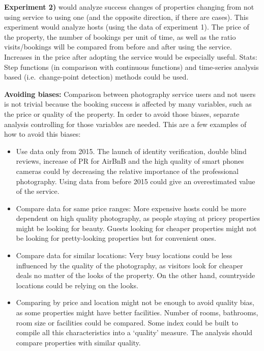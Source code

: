 \documentclass[
]{article}
\begin{document}
\textbf{Experiment 2)} would analyze success changes of properties
changing from not using service to using one (and the opposite
direction, if there are cases). This experiment would analyze hosts
(using the data of experiment 1). The price of the property, the number
of bookings per unit of time, as well as the ratio visits/bookings will
be compared from before and after using the service. Increases in the
price after adopting the service would be especially useful. Stats: Step
functions (in comparison with continuous functions) and time-series
analysis based (i.e.~change-point detection) methods could be used.

\textbf{Avoiding biases:} Comparison between photography service users
and not users is not trivial because the booking success is affected by
many variables, such as the price or quality of the property. In order
to avoid those biases, separate analysis controlling for those variables
are needed. This are a few examples of how to avoid this biases:

\begin{itemize}
\item
  Use data only from 2015. The launch of identity verification, double
  blind reviews, increase of PR for AirBnB and the high quality of smart
  phones cameras could by decreasing the relative importance of the
  professional photography. Using data from before 2015 could give an
  overestimated value of the service.
\item
  Compare data for same price ranges: More expensive hosts could be more
  dependent on high quality photography, as people staying at pricey
  properties might be looking for beauty. Guests looking for cheaper
  properties might not be looking for pretty-looking properties but for
  convenient ones.
\item
  Compare data for similar locations: Very busy locations could be less
  influenced by the quality of the photography, as visitors look for
  cheaper deals no matter of the looks of the property. On the other
  hand, countryside locations could be relying on the looks.
\item
  Comparing by price and location might not be enough to avoid quality
  bias, as some properties might have better facilities. Number of
  rooms, bathrooms, room size or facilities could be compared. Some
  index could be built to compile all this characteristics into a
  `quality' measure. The analysis should compare properties with similar
  quality.
\end{itemize}
\end{document}
